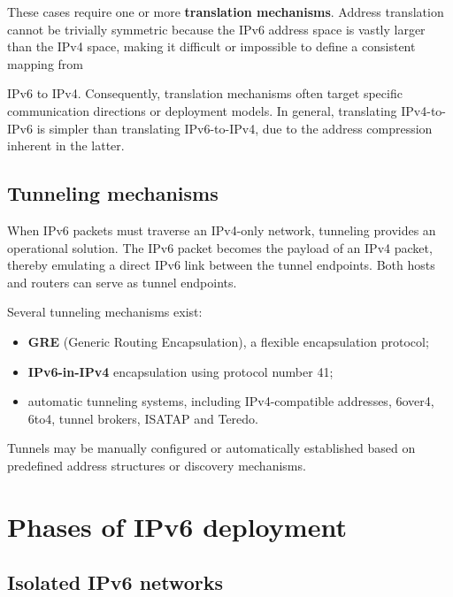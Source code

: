 These cases require one or more \textbf{translation mechanisms}. Address translation cannot be trivially symmetric because the IPv6 address space is vastly larger than the IPv4 space, making it difficult or impossible to define a consistent mapping from

IPv6 to IPv4. Consequently, translation mechanisms often target specific communication directions or deployment models. In general, translating IPv4-to-IPv6 is simpler than translating IPv6-to-IPv4, due to the address compression inherent in the latter.

\subsection{Tunneling mechanisms}

When IPv6 packets must traverse an IPv4-only network, tunneling provides an operational solution. The IPv6 packet becomes the payload of an IPv4 packet, thereby emulating a direct IPv6 link between the tunnel endpoints. Both hosts and routers can serve as tunnel endpoints.

Several tunneling mechanisms exist:

\begin{itemize}
\item \textbf{GRE} (Generic Routing Encapsulation), a flexible encapsulation protocol;
\item \textbf{IPv6-in-IPv4} encapsulation using protocol number 41;
\item automatic tunneling systems, including IPv4-compatible addresses, 6over4, 6to4, tunnel brokers, ISATAP and Teredo.
\end{itemize}

Tunnels may be manually configured or automatically established based on predefined address structures or discovery mechanisms.

\begin{center}
\end{center}

\section{Phases of IPv6 deployment}

\subsection{Isolated IPv6 networks}

